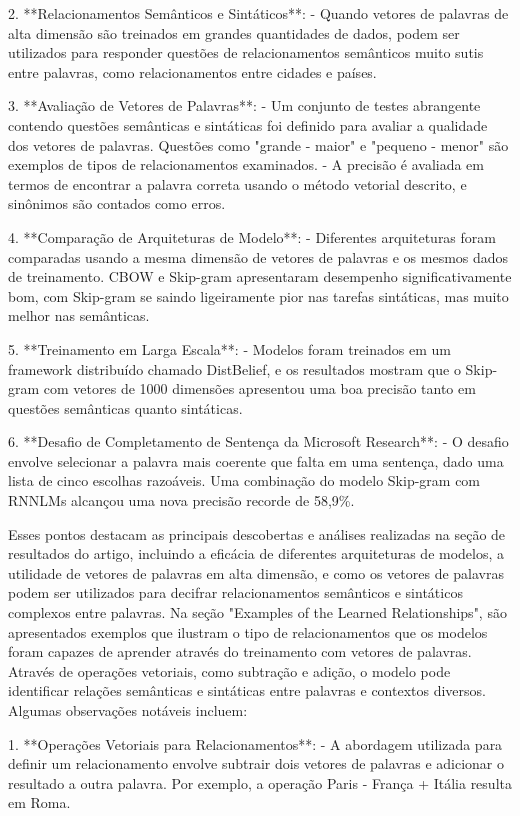 2. **Relacionamentos Semânticos e Sintáticos**:
   - Quando vetores de palavras de alta dimensão são treinados em grandes quantidades de dados, podem ser utilizados para responder questões de relacionamentos semânticos muito sutis entre palavras, como relacionamentos entre cidades e países.

3. **Avaliação de Vetores de Palavras**:
   - Um conjunto de testes abrangente contendo questões semânticas e sintáticas foi definido para avaliar a qualidade dos vetores de palavras. Questões como "grande - maior" e "pequeno - menor" são exemplos de tipos de relacionamentos examinados.
   - A precisão é avaliada em termos de encontrar a palavra correta usando o método vetorial descrito, e sinônimos são contados como erros.

4. **Comparação de Arquiteturas de Modelo**:
   - Diferentes arquiteturas foram comparadas usando a mesma dimensão de vetores de palavras e os mesmos dados de treinamento. CBOW e Skip-gram apresentaram desempenho significativamente bom, com Skip-gram se saindo ligeiramente pior nas tarefas sintáticas, mas muito melhor nas semânticas.

5. **Treinamento em Larga Escala**:
   - Modelos foram treinados em um framework distribuído chamado DistBelief, e os resultados mostram que o Skip-gram com vetores de 1000 dimensões apresentou uma boa precisão tanto em questões semânticas quanto sintáticas.

6. **Desafio de Completamento de Sentença da Microsoft Research**:
   - O desafio envolve selecionar a palavra mais coerente que falta em uma sentença, dado uma lista de cinco escolhas razoáveis. Uma combinação do modelo Skip-gram com RNNLMs alcançou uma nova precisão recorde de 58,9\%.

Esses pontos destacam as principais descobertas e análises realizadas na seção de resultados do artigo, incluindo a eficácia de diferentes arquiteturas de modelos, a utilidade de vetores de palavras em alta dimensão, e como os vetores de palavras podem ser utilizados para decifrar relacionamentos semânticos e sintáticos complexos entre palavras. 
Na seção "Examples of the Learned Relationships", são apresentados exemplos que ilustram o tipo de relacionamentos que os modelos foram capazes de aprender através do treinamento com vetores de palavras. Através de operações vetoriais, como subtração e adição, o modelo pode identificar relações semânticas e sintáticas entre palavras e contextos diversos. Algumas observações notáveis incluem:

1. **Operações Vetoriais para Relacionamentos**:
   - A abordagem utilizada para definir um relacionamento envolve subtrair dois vetores de palavras e adicionar o resultado a outra palavra. Por exemplo, a operação Paris - França + Itália resulta em Roma.


